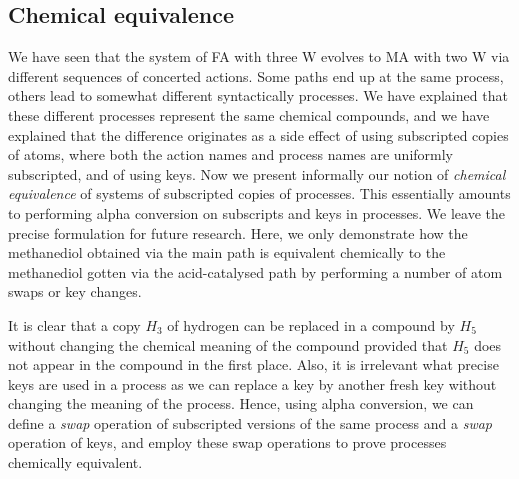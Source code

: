 \subsection{Chemical equivalence}\label{chem-eq}
We have seen that the system of FA with three W evolves to MA with two W via different sequences of
concerted actions. Some paths end up at the same process, others lead to somewhat 
different syntactically processes. We have explained that these different processes represent
the same chemical compounds, and we have explained that the difference originates as a side effect
of using subscripted copies of atoms, where both the action names and process names are uniformly 
subscripted, and of using keys. Now we present informally our notion of \emph{chemical equivalence} 
of systems of subscripted 
copies of processes. This essentially amounts to performing alpha conversion on subscripts and keys 
in processes.  We leave the precise formulation for 
future research. Here, we only demonstrate how the methanediol obtained via the main path 
is equivalent chemically to the methanediol gotten via the acid-catalysed path
by performing a number of atom swaps or key changes.

It is clear that a copy $H_3$ of hydrogen can be replaced 
in a compound by $H_5$ without changing the chemical meaning of the compound
provided that $H_5$ does not appear in the compound in the first place. 
Also, it is irrelevant what precise keys are used in a process as we can replace a key
by another fresh key without changing the meaning of the process. Hence, using alpha conversion, 
we can define a \emph{swap} operation of subscripted versions of the same process and 
a \emph{swap} operation of keys,
and employ these swap operations to prove processes chemically equivalent. 



